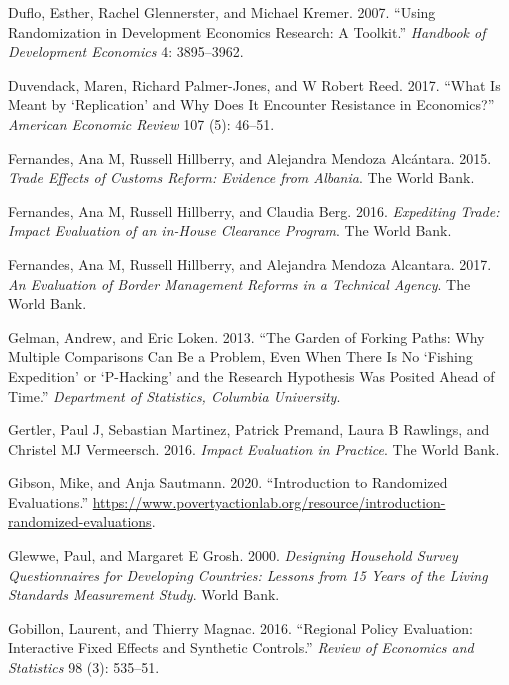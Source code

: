 \documentclass[
]{book}
\begin{document}
\leavevmode\hypertarget{ref-duflo2007using}{}%
Duflo, Esther, Rachel Glennerster, and Michael Kremer. 2007. ``Using Randomization in Development Economics Research: A Toolkit.'' \emph{Handbook of Development Economics} 4: 3895--3962.

\leavevmode\hypertarget{ref-duvendack2017meant}{}%
Duvendack, Maren, Richard Palmer-Jones, and W Robert Reed. 2017. ``What Is Meant by `Replication' and Why Does It Encounter Resistance in Economics?'' \emph{American Economic Review} 107 (5): 46--51.

\leavevmode\hypertarget{ref-fernandes2015trade}{}%
Fernandes, Ana M, Russell Hillberry, and Alejandra Mendoza Alcántara. 2015. \emph{Trade Effects of Customs Reform: Evidence from Albania}. The World Bank.

\leavevmode\hypertarget{ref-fernandes2016expediting}{}%
Fernandes, Ana M, Russell Hillberry, and Claudia Berg. 2016. \emph{Expediting Trade: Impact Evaluation of an in-House Clearance Program}. The World Bank.

\leavevmode\hypertarget{ref-fernandes2017evaluation}{}%
Fernandes, Ana M, Russell Hillberry, and Alejandra Mendoza Alcantara. 2017. \emph{An Evaluation of Border Management Reforms in a Technical Agency}. The World Bank.

\leavevmode\hypertarget{ref-gelman2013garden}{}%
Gelman, Andrew, and Eric Loken. 2013. ``The Garden of Forking Paths: Why Multiple Comparisons Can Be a Problem, Even When There Is No `Fishing Expedition' or `P-Hacking' and the Research Hypothesis Was Posited Ahead of Time.'' \emph{Department of Statistics, Columbia University}.

\leavevmode\hypertarget{ref-gertler2016impact}{}%
Gertler, Paul J, Sebastian Martinez, Patrick Premand, Laura B Rawlings, and Christel MJ Vermeersch. 2016. \emph{Impact Evaluation in Practice}. The World Bank.

\leavevmode\hypertarget{ref-JPAL2020rct}{}%
Gibson, Mike, and Anja Sautmann. 2020. ``Introduction to Randomized Evaluations.'' \url{https://www.povertyactionlab.org/resource/introduction-randomized-evaluations}.

\leavevmode\hypertarget{ref-glewwe2000designing}{}%
Glewwe, Paul, and Margaret E Grosh. 2000. \emph{Designing Household Survey Questionnaires for Developing Countries: Lessons from 15 Years of the Living Standards Measurement Study}. World Bank.

\leavevmode\hypertarget{ref-gobillon2016regional}{}%
Gobillon, Laurent, and Thierry Magnac. 2016. ``Regional Policy Evaluation: Interactive Fixed Effects and Synthetic Controls.'' \emph{Review of Economics and Statistics} 98 (3): 535--51.
\end{document}
